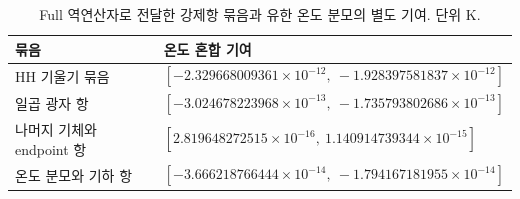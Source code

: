 \begin{table}[H]
\centering\small
\caption{Full 역연산자로 전달한 강제항 묶음과 유한 온도 분모의 별도 기여. 단위 K.}
\label{tab:groups}
\begin{tabular}{ll}\toprule
묶음 & 온도 혼합 기여 \\\midrule
HH 기울기 묶음 & $[-2.329668009361\times10^{-12},\ -1.928397581837\times10^{-12}]$ \\
일곱 광자 항 & $[-3.024678223968\times10^{-13},\ -1.735793802686\times10^{-13}]$ \\
나머지 기체와 endpoint 항 & $[2.819648272515\times10^{-16},\ 1.140914739344\times10^{-15}]$ \\
온도 분모와 기하 항 & $[-3.666218766444\times10^{-14},\ -1.794167181955\times10^{-14}]$ \\
\bottomrule\end{tabular}
\end{table}
